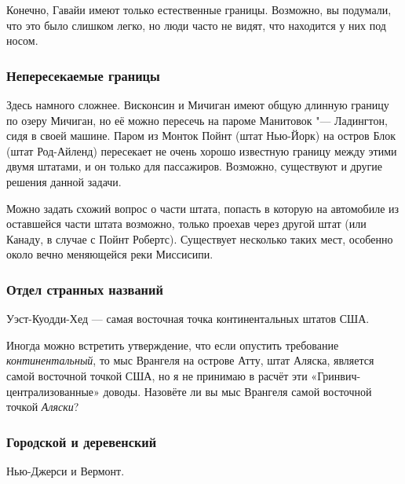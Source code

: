 \documentclass[twoside]{book}
\begin{document}
Конечно, Гавайи имеют только естественные границы.
Возможно, вы подумали, что это было слишком легко, но люди часто не видят, что находится у них под носом.
\heart

\subsubsection*{Непересекаемые границы}%

Здесь намного сложнее.
Висконсин и Мичиган имеют общую длинную границу по озеру Мичиган, но её можно пересечь на пароме Манитовок "--- Ладингтон, сидя в своей машине.
Паром из Монток Пойнт %
(штат Нью-Йорк) на остров Блок %
(штат Род-Айленд) пересекает не очень хорошо известную границу между этими двумя штатами, и он только для пассажиров.
Возможно, существуют и другие решения данной задачи.\heart
                             

Можно задать схожий вопрос о части штата, попасть в которую на автомобиле из оставшейся части штата возможно, только проехав через другой штат (или Канаду, в случае с 
Пойнт Робертс). %
Существует несколько таких мест, особенно около вечно меняющейся реки Миссисипи.%

\subsubsection*{Отдел странных названий}%

Уэст-Куодди-Хед %
--- самая восточная точка континентальных штатов США.\heart
                            

Иногда можно встретить утверждение, что если опустить требование \emph{континентальный}, то мыс Врангеля %
на острове Атту, %
штат Аляска, является самой восточной точкой США, но я не принимаю в расчёт эти «Гринвич-централизованные» доводы.
Назовёте ли вы мыс Врангеля самой восточной точкой \emph{Аляски}?

\subsubsection*{Городской и деревенский}%

Нью-Джерси и Вермонт.
\end{document}
